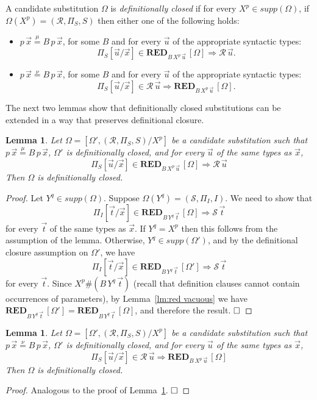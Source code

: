 \documentclass[preprint]{elsarticle}
\def\Rscr{{\mathcal R}}
\def\Sscr{{\mathcal S}}
\newcommand{\defmu}{\stackrel{\mu}{=}}
\newcommand{\defnu}{\stackrel{\nu}{=}}
\def\RED{{\mathbf{RED}}}
\newtheorem{lemma}[thm]{Lemma}
\def\qed{$\hfill\Box$}
\begin{document}
\begin{definition}
  A candidate substitution $\Omega$ is \emph{definitionally closed} if
  for every $X^p \in supp(\Omega)$, if $\Omega(X^p) = (\Rscr, \Pi_S,
  S)$ then either one of the following holds:
  \begin{itemize}
  \item $p\,\vec x \defmu B\,p\,\vec x$, for some $B$ and for every
    $\vec u$ of the appropriate syntactic types:
$$
\Pi_S[\vec u/\vec x] \in \RED_{B\,X^p\,\vec u}\, [\Omega] \Rightarrow
\Rscr\,\vec u.
$$

\item $p\,\vec x \defnu B\,p\,\vec x$, for some $B$ and for every
  $\vec u$ of the appropriate syntactic types:
$$
\Pi_S[\vec u/\vec x] \in \Rscr\,\vec u \Rightarrow \RED_{B\,X^p\,\vec
  u}\, [\Omega].
$$
\end{itemize}
\end{definition}

The next two lemmas show that definitionally closed substitutions can
be extended in a way that preserves  definitional closure.

\begin{lemma}
  \label{lm:clo-ext-ind}
  Let $\Omega = [\Omega', (\Rscr,\Pi_S,S)/X^p]$ be a candidate
  substitution such that $p\,\vec x \defmu B\,p\,\vec x$, $\Omega'$ is
  definitionally closed, and for every $\vec u$ of the same types as
  $\vec x$,
$$\Pi_S[\vec u/\vec x] \in \RED_{B\,X^p\,\vec u}\, [\Omega] \Rightarrow
\Rscr\,\vec u$$  Then $\Omega$ is definitionally closed.
\end{lemma}
\begin{proof}
  Let $Y^q \in supp(\Omega)$. Suppose $\Omega(Y^q) = (\Sscr, \Pi_I,
  I)$.  We need to show that
$$
\Pi_I[\vec t/\vec x] \in \RED_{B\,Y^q\,\vec t}\, [\Omega] \Rightarrow
\Sscr\,\vec t
$$
for every $\vec t$ of the same types as $\vec x$.  If $Y^q = X^p$ then
this follows from the assumption of the lemma.  Otherwise, $Y^q \in
supp(\Omega')$, and by the definitional closure assumption on
$\Omega'$, we have
$$
\Pi_I[\vec t/\vec x] \in \RED_{B\,Y^q\,\vec t}\, [\Omega'] \Rightarrow
\Sscr\,\vec t
$$
for every $\vec t$.  Since  $X^p \#
(B\,Y^q\,\vec t)$ (recall that definition clauses cannot contain
occurrences of parameters), by Lemma~\ref{lm:red vacuous} we have
$\RED_{B\,Y^q\,\vec t}\, [\Omega'] = \RED_{B\,Y^q\,\vec t}\, [\Omega]$, and
therefore the result. \qed
\end{proof}

\begin{lemma}
  \label{lm:clo-ext-coind}
  Let $\Omega = [\Omega', (\Rscr,\Pi_S,S)/X^p]$ be a candidate
  substitution such that $p\,\vec x \defnu B\,p\,\vec x$, $\Omega'$ is
  definitionally closed, and for every $\vec u$ of the same types as
  $\vec x$,
$$\Pi_S[\vec u/\vec x] \in \Rscr \,\vec u \Rightarrow
\RED_{B\,X^p\,\vec u}\, [\Omega]$$  Then $\Omega$ is definitionally
closed.
\end{lemma}
\begin{proof}
  Analogous to the proof of Lemma~\ref{lm:clo-ext-ind}. \qed
\end{proof}
\end{document}
